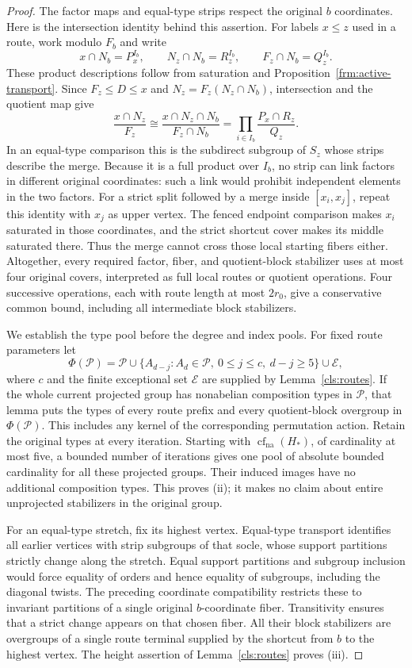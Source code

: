 \begin{proof}
The factor maps and equal-type strips respect the original $b$
coordinates.  Here is the intersection identity behind this assertion.
For labels $x\leq z$ used in a route, work modulo $F_b$ and write
\[
 x\cap N_b=P_x^{I_b},\qquad
 N_z\cap N_b=R_z^{I_b},\qquad F_z\cap N_b=Q_z^{I_b}.
\]
These product descriptions follow from saturation and
Proposition~\ref{frm:active-transport}.  Since $F_z\leq D\leq x$ and
$N_z=F_z(N_z\cap N_b)$, intersection and the quotient map give
\[
 \frac{x\cap N_z}{F_z}
 \cong \frac{x\cap N_z\cap N_b}{F_z\cap N_b}
 =\prod_{i\in I_b}\frac{P_x\cap R_z}{Q_z}.
\]
In an equal-type comparison this is the subdirect subgroup of $S_z$
whose strips describe the merge.  Because it is a full product over
$I_b$, no strip can link factors in different original coordinates:
such a link would prohibit independent elements in the two factors.
For a strict split followed by a merge inside $[x_i,x_j]$, repeat this
identity with $x_j$ as upper vertex.  The fenced endpoint comparison
makes $x_i$ saturated in those coordinates, and the strict shortcut
cover makes its middle saturated there.  Thus the merge cannot cross
those local starting fibers either.
Altogether, every required factor, fiber, and quotient-block
stabilizer uses at most four original covers, interpreted as full
local routes or quotient operations.  Four successive operations,
each with route length at most $2r_0$, give a conservative common
bound, including all intermediate block stabilizers.

We establish the type pool before the degree and index pools.  For
fixed route parameters let
\[
 \Phi(\mathcal P)=\mathcal P
\mathbin{\cup}\{A_{d-j}:A_d\in\mathcal P,\ 0\leq j\leq c,\ d-j\geq5\}
\mathbin{\cup}\mathcal E,
\]
where $c$ and the finite exceptional set $\mathcal E$ are supplied
by Lemma~\ref{cls:routes}.  If the whole current projected group has
nonabelian composition types in $\mathcal P$, that lemma puts the
types of every route prefix and every quotient-block overgroup in
$\Phi(\mathcal P)$.  This includes any kernel of the corresponding
permutation action.  Retain the original types at every iteration.
Starting with $\operatorname{cf}_{\mathrm{na}}(H_*)$, of cardinality
at most five, a bounded number of iterations gives one pool of
absolute bounded cardinality for all these projected groups.
Their induced images have no additional composition types.  This
proves (ii); it makes no claim about entire unprojected stabilizers
in the original group.

For an equal-type stretch, fix its highest vertex.  Equal-type
transport identifies all earlier vertices with strip subgroups
of that socle, whose support partitions strictly change along the
stretch.  Equal support partitions and subgroup inclusion would
force equality of orders and hence equality of subgroups, including
the diagonal twists.  The preceding coordinate compatibility
restricts these to invariant partitions of a single original
$b$-coordinate fiber.  Transitivity ensures that a strict change
appears on that chosen fiber.  All their block stabilizers are
overgroups of a single route terminal supplied by the shortcut
from $b$ to the highest vertex.  The height assertion of
Lemma~\ref{cls:routes} proves (iii).


\end{proof}

